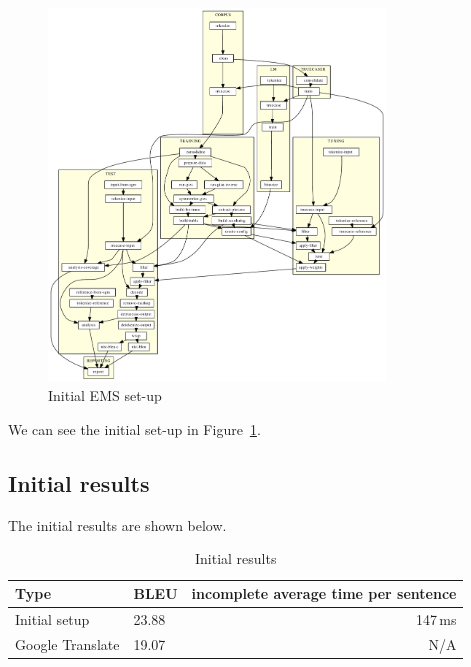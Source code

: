 \begin{figure}[h]
\begin{center}
\includegraphics[width=0.8\textwidth]{figures/moses_13_graf.pdf}
\end{center}
\caption{Initial EMS set-up}\label{moses:initial}
\end{figure}

We can see the initial set-up in Figure~\ref{moses:initial}.
\subsection{Initial results}

The initial results are shown below.

\begin{table}[h]
\begin{center}
\begin{tabular}{|l|l|r|}
    \hline
    \textbf{Type} & \textbf{BLEU} & \textbf{incomplete average time per sentence} \\ \hline
    Initial setup & 23.88 & 147\,ms \\ \hline
    Google Translate & 19.07 & N/A \\  \hline
\end{tabular}
\end{center}

\caption{Initial results}\label{moses:initialresults}
\end{table}

